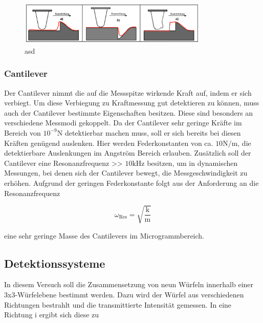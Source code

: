           \FloatBarrier

          \begin{figure}[h]
            \centering
            \includegraphics[width = 0.8\textwidth]{pictures/defekte.png}
            \caption{asd}
            \label{fig:defekte}
          \end{figure}
        
          \FloatBarrier

        
          \newpage
        \subsubsection*{Cantilever}
          Der Cantilever nimmt die auf die Messspitze wirkende Kraft auf, indem er sich verbiegt. Um diese Verbiegung zu Kraftmessung gut detektieren zu können, muss auch der Cantilever bestimmte Eigenschaften
          besitzen. Diese sind besonders an verschiedene Messmodi gekoppelt. Da der Cantilever sehr geringe Kräfte im Bereich von $10^{-9} \si{\newton}$ detektierbar machen muss, soll er sich bereits bei diesen
          Kräften genügend auslenken. Hier werden Federkonstanten von ca. $10 \si{\newton\per\metre}$, die detektierbare Auslenkungen im Angström Bereich erlauben. Zusätzlich soll der Cantilever eine  
          Resonanzfrequenz >> $10 \si{\kilo\hertz}$ besitzen, um in dynamischen Messungen, bei denen sich der Cantilever bewegt, die Messgeschwindigkeit zu erhöhen. Aufgrund der geringen Federkonstante folgt
          aus der Anforderung an die Resonanzfrequenz

          \begin{equation*}
            \omega_{\text{Res}} = \sqrt{\frac{\text{k}}{\text{m}}}
          \end{equation*}

          eine sehr geringe Masse des Cantilevers im Microgrammbereich.


      \newpage
      \subsection{Detektionssysteme}
          In diesem Versuch soll die Zusammensetzung von neun Würfeln innerhalb einer 3x3-Würfelebene bestimmt werden. Dazu wird der Würfel aus verschiedenen Richtungen bestrahlt und die transmittierte 
          Intensität gemessen. In eine Richtung i ergibt sich diese zu


